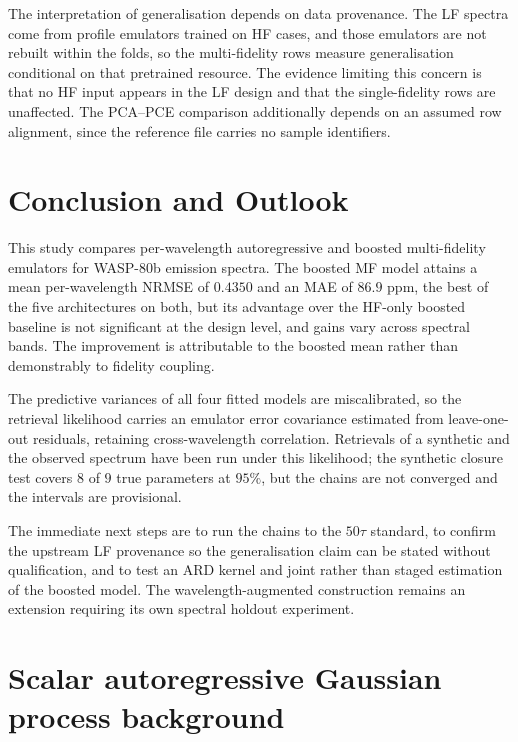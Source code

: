 \documentclass[12pt, letterpaper, oneside]{article}
\begin{document}
The interpretation of generalisation depends on data provenance. The LF
spectra come from profile emulators trained on HF cases, and those emulators
are not rebuilt within the folds, so the multi-fidelity rows measure
generalisation conditional on that pretrained resource. The evidence limiting
this concern is that no HF input appears in the LF design and that the
single-fidelity rows are unaffected. The PCA--PCE comparison additionally
depends on an assumed row alignment, since the reference file carries no
sample identifiers.

\section{Conclusion and Outlook}

This study compares per-wavelength autoregressive and boosted multi-fidelity
emulators for WASP-80b emission spectra. The boosted MF model attains a mean
per-wavelength NRMSE of $0.4350$ and an MAE of $86.9$ ppm, the best of the five
architectures on both, but its advantage over the HF-only boosted baseline is
not significant at the design level, and gains vary across spectral bands. The
improvement is attributable to the boosted mean rather than demonstrably to
fidelity coupling.

The predictive variances of all four fitted models are miscalibrated, so the
retrieval likelihood carries an emulator error covariance estimated from
leave-one-out residuals, retaining cross-wavelength correlation. Retrievals of
a synthetic and the observed spectrum have been run under this likelihood; the
synthetic closure test covers $8$ of $9$ true parameters at $95\%$, but the
chains are not converged and the intervals are provisional.

The immediate next steps are to run the chains to the $50\tau$ standard, to
confirm the upstream LF provenance so the generalisation claim can be stated
without qualification, and to test an ARD kernel and joint rather than staged
estimation of the boosted model. The wavelength-augmented construction remains
an extension requiring its own spectral holdout experiment.



\appendix

\section{Scalar autoregressive Gaussian process background}
\label{app:ar_background}
\label{subsec:ar_gp}
\end{document}
